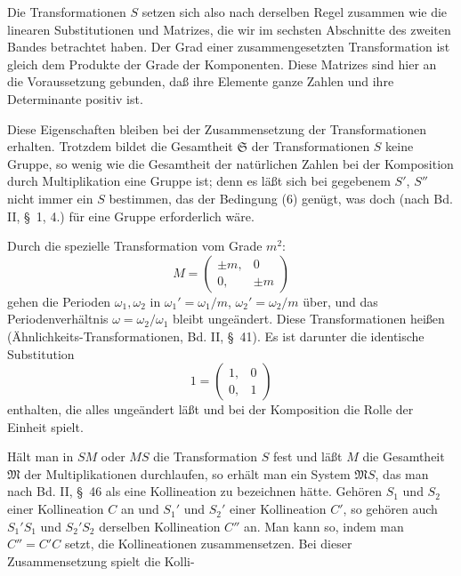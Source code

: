 
Die Transformationen $S$ setzen sich also nach derselben Regel zusammen wie die linearen Substitutionen und Matrizes, die wir im sechsten Abschnitte des zweiten Bandes betrachtet haben. Der Grad einer zusammengesetzten Transformation ist gleich dem Produkte der Grade der Komponenten. Diese Matrizes sind hier an die Voraussetzung gebunden, daß ihre Elemente ganze Zahlen und ihre Determinante positiv ist.

Diese Eigenschaften bleiben bei der Zusammensetzung der Transformationen erhalten. Trotzdem bildet die Gesamtheit $\mathfrak{S}$ der Transformationen $S$ keine Gruppe, so wenig wie die Gesamtheit der natürlichen Zahlen bei der Komposition durch Multiplikation eine Gruppe ist; denn es läßt sich bei gegebenem $S'$, $S''$ nicht immer ein $S$ bestimmen, das der Bedingung (6) genügt, was doch (nach Bd. II, \S\ 1, 4.) für eine Gruppe erforderlich wäre.

Durch die spezielle Transformation vom Grade $m^2$:
\[
M = \begin{pmatrix} \pm m, & 0 \\ 0, & \pm m \end{pmatrix}
\]
gehen die Perioden $\omega_1, \omega_2$ in $\omega_1' = \omega_1/m$, $\omega_2' = \omega_2/m$ über, und das Periodenverhältnis $\omega = \omega_2/\omega_1$ bleibt ungeändert. Diese Transformationen heißen  (Ähnlichkeits-Transformationen, Bd. II, \S\ 41). Es ist darunter die identische Substitution
\[
1 = \begin{pmatrix} 1, & 0 \\ 0, & 1 \end{pmatrix}
\]
enthalten, die alles ungeändert läßt und bei der Komposition die Rolle der Einheit spielt.



Hält man in $SM$ oder $MS$ die Transformation $S$ fest und läßt $M$ die Gesamtheit $\mathfrak{M}$ der Multiplikationen durchlaufen, so erhält man ein System $\mathfrak{M}S$, das man nach Bd. II, \S\ 46 als eine Kollineation zu bezeichnen hätte. Gehören $S_1$ und $S_2$ einer Kollineation $C$ an und $S_1'$ und $S_2'$ einer Kollineation $C'$, so gehören auch $S_1'S_1$ und $S_2'S_2$ derselben Kollineation $C''$ an. Man kann so, indem man $C'' = C'C$ setzt, die Kollineationen zusammensetzen. Bei dieser Zusammensetzung spielt die Kolli-
